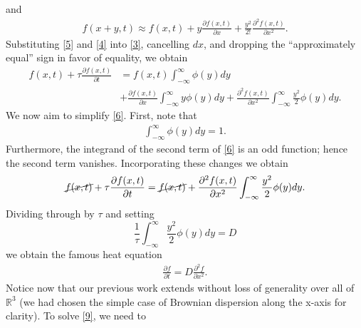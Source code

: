 \documentclass[12pt,reqno]{amsart}
\newcommand{\rr}{\mathbb{R}}
\newcommand{\p}{\partial}
\theoremstyle{plain}  %
\theoremstyle{definition}
\begin{document}
and
\begin{equation}
  \begin{split}
    f(x + y, t) \approx f(x,t) + y \frac{\p f(x,t)}{\p x} +
    \frac{y^2}{2!}\frac{\p^2 f(x,t)}{\p x^2}.
    \label{5}
  \end{split}
\end{equation}
Substituting \eqref{5} and \eqref{4} into \eqref{3}, cancelling $dx$, and dropping the
``approximately equal'' sign in favor of equality, we obtain
\begin{equation}
  \begin{split}
    f(x, t ) + \tau \frac{\p f(x,t)}{\p t}
    & = f(x,t) \int_{-\infty}^{\infty} \phi(y)
    dy
    \\
    & + \frac{\p f(x,t)}{\p x} \int_{-\infty}^{\infty} y \phi(y) dy +
    \frac{\p^2 f(x,t)}{\p x^2} \int_{-\infty}^{\infty} \frac{y^2}{2}\phi(y) dy.
    \label{6}
  \end{split}
\end{equation}
We now aim to simplify \eqref{6}. First, note that 
\begin{equation*}
  \begin{split}
    \int_{-\infty}^{\infty} \phi(y) dy = 1
    \label{7}.
  \end{split}
\end{equation*}
Furthermore, the integrand of the second term of \eqref{6} is an odd function; hence
the second term vanishes. Incorporating these changes we obtain
\begin{equation*}
  \begin{split}
    \cancel{f(x, t )} + \tau \frac{\p f(x,t)}{\p t}
    = \cancel{f(x,t)} +
    \frac{\p^2 f(x,t)}{\p x^2} \int_{-\infty}^{\infty} \frac{y^2}{2}\phi(y) dy.
    \label{8}
  \end{split}
\end{equation*}
Dividing through by $\tau$ and setting 
\begin{equation*}
  \frac{1}{\tau}\int_{-\infty}^{\infty} \frac{y^2}{2}\phi(y) dy = D
\end{equation*}
we obtain the famous heat equation
\begin{equation}
  \begin{split}
    \frac{\p f}{\p t} = D \frac{\p^2 f}{\p x^2}.
    \label{9}
  \end{split}
\end{equation}
Notice now that our previous work extends
without loss of generality over all of $\rr^3$ (we had chosen the simple case of
Brownian dispersion along the x-axis for clarity). To solve \eqref{9}, we need to
\end{document}
